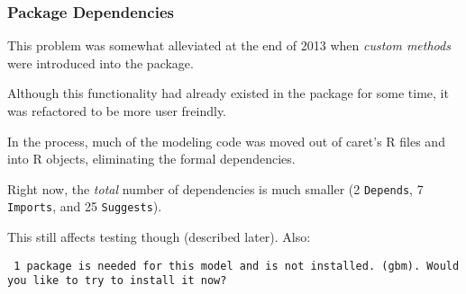 \documentclass[12 pt]{beamer}\usepackage[]{graphicx}\usepackage[]{color}
\newcommand{\pkg}[1]{{\fontseries{b}\selectfont #1}}
\renewcommand{\pkg}[1]{{\color{darkgreen}\textsf{#1}}}
\begin{document}
  
\begin{frame}[fragile]
\frametitle{Package Dependencies}

This problem was somewhat alleviated at the end of 2013 when {\em custom methods} were introduced into the package. 

\vspace{.1in}

Although this functionality had already existed in the package for some time, it was refactored to be more user freindly. 

\vspace{.1in}

In the process, much of the modeling code was moved out of \pkg{caret}'s R files and into R objects, eliminating the formal dependencies. 

\vspace{.1in}

Right now, the {\em total} number of dependencies is much smaller (2 \texttt{Depends}, 7 \texttt{Imports}, and 25 \texttt{Suggests}). 

\vspace{.1in}

This still affects testing though (described later). Also:

\vspace{.1in}

{\tt \color{darkblue} \footnotesize 1 package is needed for this model and is not installed. (gbm). Would you like to try to install it now?}

\end{frame}


  
\end{document}
